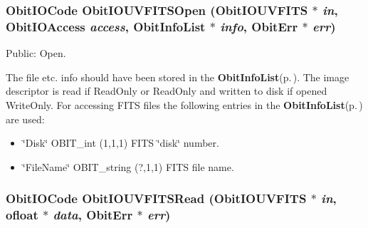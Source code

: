 \subsubsection{\setlength{\rightskip}{0pt plus 5cm}Obit\-IOCode Obit\-IOUVFITSOpen ({\bf Obit\-IOUVFITS} $\ast$ {\em in}, Obit\-IOAccess {\em access}, {\bf Obit\-Info\-List} $\ast$ {\em info}, {\bf Obit\-Err} $\ast$ {\em err})}\label{ObitIOUVFITS_8h_a10}


Public: Open. 

The file etc. info should have been stored in the {\bf Obit\-Info\-List}{\rm (p.\,\pageref{structObitInfoList})}. The image descriptor is read if Read\-Only or Read\-Only and written to disk if opened Write\-Only. For accessing FITS files the following entries in the {\bf Obit\-Info\-List}{\rm (p.\,\pageref{structObitInfoList})} are used: \begin{itemize}
\item \char`\"{}Disk\char`\"{} OBIT\_\-int (1,1,1) FITS \char`\"{}disk\char`\"{} number. \item \char`\"{}File\-Name\char`\"{} OBIT\_\-string (?,1,1) FITS file name. 
\end{itemize}
\subsubsection{\setlength{\rightskip}{0pt plus 5cm}Obit\-IOCode Obit\-IOUVFITSRead ({\bf Obit\-IOUVFITS} $\ast$ {\em in}, {\bf ofloat} $\ast$ {\em data}, {\bf Obit\-Err} $\ast$ {\em err})}\label{ObitIOUVFITS_8h_a13}


